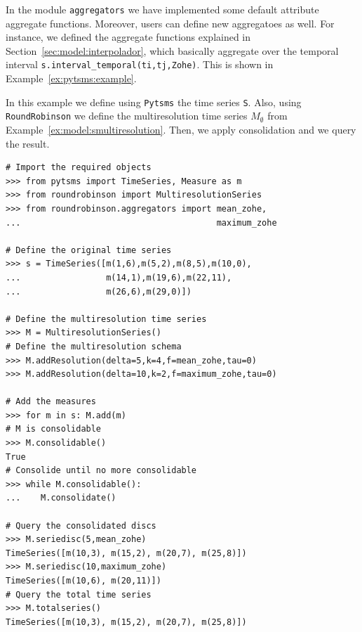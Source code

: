 In the module \texttt{aggregators} we have implemented some default
attribute aggregate functions. Moreover, users can define new
aggregatoes as well. For instance, we defined the \zohe{} aggregate
functions explained in Section~\ref{sec:model:interpolador}, which
basically aggregate over the temporal interval
\verb|s.interval_temporal(ti,tj,Zohe)|. This is shown in
Example~\ref{ex:pytsms:example}.


\begin{example}
  In this example we define using \texttt{Pytsms} the time series
  \texttt{S}. Also, using \texttt{RoundRobinson} we define the
  multiresolution time series $M_\emptyset$ from
  Example~\ref{ex:model:smultiresolution}. Then, we apply
  consolidation and we query the result.

{\small
\begin{verbatim}
# Import the required objects
>>> from pytsms import TimeSeries, Measure as m
>>> from roundrobinson import MultiresolutionSeries
>>> from roundrobinson.aggregators import mean_zohe,
...                                       maximum_zohe

# Define the original time series
>>> s = TimeSeries([m(1,6),m(5,2),m(8,5),m(10,0),
...                 m(14,1),m(19,6),m(22,11),
...                 m(26,6),m(29,0)])

# Define the multiresolution time series
>>> M = MultiresolutionSeries()
# Define the multiresolution schema
>>> M.addResolution(delta=5,k=4,f=mean_zohe,tau=0)
>>> M.addResolution(delta=10,k=2,f=maximum_zohe,tau=0)

# Add the measures
>>> for m in s: M.add(m)
# M is consolidable
>>> M.consolidable()
True
# Consolide until no more consolidable
>>> while M.consolidable():
...    M.consolidate()

# Query the consolidated discs 
>>> M.seriedisc(5,mean_zohe)
TimeSeries([m(10,3), m(15,2), m(20,7), m(25,8)])
>>> M.seriedisc(10,maximum_zohe)
TimeSeries([m(10,6), m(20,11)])
# Query the total time series
>>> M.totalseries()
TimeSeries([m(10,3), m(15,2), m(20,7), m(25,8)])
\end{verbatim}
}
\end{example}





